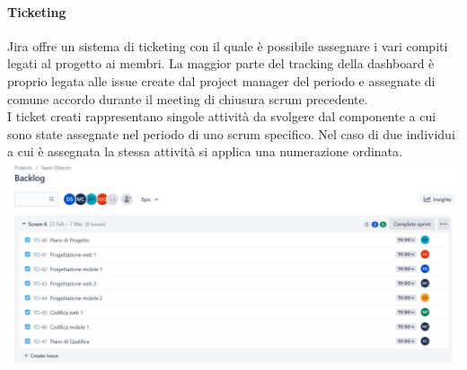 \paragraph{Ticketing}
Jira offre un sistema di ticketing con il quale è possibile assegnare i vari compiti legati al progetto ai membri. La maggior parte del tracking della dashboard è proprio legata alle issue create dal project manager del periodo e assegnate di comune accordo durante il meeting di chiusura scrum precedente.\\[0.1cm]
I ticket creati rappresentano singole attività da svolgere dal componente a cui sono state assegnate nel periodo di uno scrum specifico. Nel caso di due individui a cui è assegnata la stessa attività si applica una numerazione ordinata.\\[0.5cm]
\includegraphics[scale=0.45]{img/issues.PNG}

